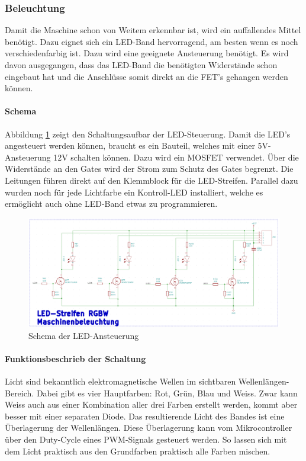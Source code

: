 \subsubsection{Beleuchtung}
\label{subsec:Beleuchtung_2}


Damit die Maschine schon von Weitem erkennbar ist, wird ein auffallendes Mittel benötigt. Dazu eignet sich ein LED-Band hervorragend, am besten wenn es noch verschiedenfarbig ist. Dazu wird eine geeignete Ansteuerung benötigt. Es wird davon ausgegangen, dass das LED-Band die benötigten Widerstände schon eingebaut hat und die Anschlüsse somit direkt an die FET's gehangen werden können.

\paragraph{Schema}\mbox{}

Abbildung \ref{fig:Schema_LED} zeigt den Schaltungsaufbar der LED-Steuerung. Damit die LED's angesteuert werden können, braucht es ein Bauteil, welches mit einer 5V-Ansteuerung 12V schalten können. Dazu wird ein MOSFET verwendet. Über die Widerstände an den Gates wird der Strom zum Schutz des Gates begrenzt. Die Leitungen führen direkt auf den Klemmblock für die LED-Streifen. Parallel dazu wurden noch für jede Lichtfarbe ein Kontroll-LED installiert, welche es ermöglicht auch ohne LED-Band etwas zu programmieren.

\begin{figure}[!h]
\center
\includegraphics[width =  \textwidth]{graphics/Schema_LED}
\caption{Schema der LED-Ansteuerung}
\label{fig:Schema_LED}
\end{figure}
\newpage
\paragraph{Funktionsbeschrieb der Schaltung}\mbox{}

Licht sind bekanntlich elektromagnetische Wellen im sichtbaren Wellenlängen-Bereich. Dabei gibt es vier Hauptfarben: Rot, Grün, Blau und Weiss. Zwar kann Weiss auch aus einer Kombination aller drei Farben erstellt werden, kommt aber besser mit einer separaten Diode. Das resultierende Licht des Bandes ist eine Überlagerung der Wellenlängen. Diese Überlagerung kann vom Mikrocontroller über den Duty-Cycle eines PWM-Signals gesteuert werden. So lassen sich mit dem Licht praktisch aus den Grundfarben praktisch alle Farben mischen.
